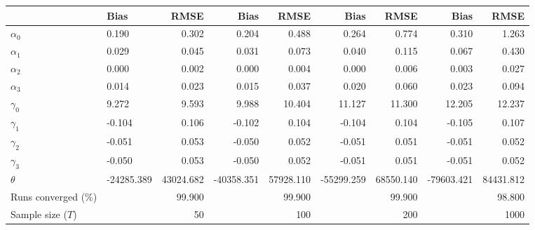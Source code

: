 
\begin{tabular}[t]{llrrrrrrr}
\toprule
  & Bias & RMSE & Bias & RMSE & Bias & RMSE & Bias & RMSE\\
\midrule
$\alpha_{0}$ & 0.190 & 0.302 & 0.204 & 0.488 & 0.264 & 0.774 & 0.310 & 1.263\\
$\alpha_{1}$ & 0.029 & 0.045 & 0.031 & 0.073 & 0.040 & 0.115 & 0.067 & 0.430\\
$\alpha_{2}$ & 0.000 & 0.002 & 0.000 & 0.004 & 0.000 & 0.006 & 0.003 & 0.027\\
$\alpha_{3}$ & 0.014 & 0.023 & 0.015 & 0.037 & 0.020 & 0.060 & 0.023 & 0.094\\
$\gamma_{0}$ & 9.272 & 9.593 & 9.988 & 10.404 & 11.127 & 11.300 & 12.205 & 12.237\\
$\gamma_{1}$ & -0.104 & 0.106 & -0.102 & 0.104 & -0.104 & 0.104 & -0.105 & 0.107\\
$\gamma_{2}$ & -0.051 & 0.053 & -0.050 & 0.052 & -0.051 & 0.051 & -0.051 & 0.052\\
$\gamma_{3}$ & -0.050 & 0.053 & -0.050 & 0.052 & -0.051 & 0.051 & -0.051 & 0.052\\
$\theta$ & -24285.389 & 43024.682 & -40358.351 & 57928.110 & -55299.259 & 68550.140 & -79603.421 & 84431.812\\
Runs converged (\%) &  & 99.900 &  & 99.900 &  & 99.900 &  & 98.800\\
Sample size ($T$) &  & 50 &  & 100 &  & 200 &  & 1000\\
\bottomrule
\end{tabular}
